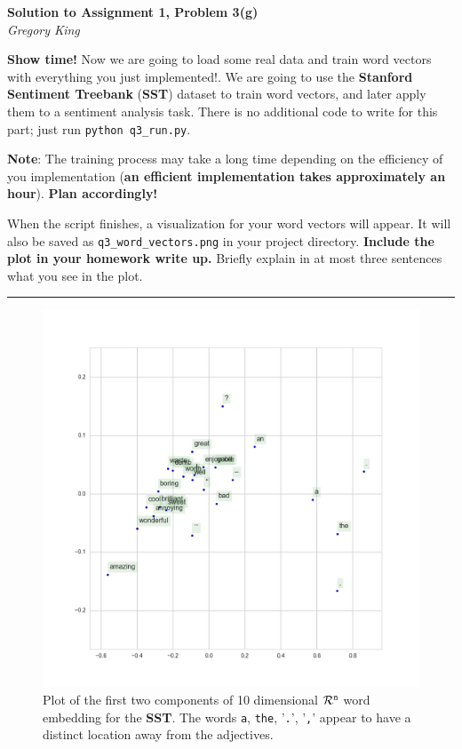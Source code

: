 \documentclass[letter,12pt]{article}
\newcommand{\myhwtitle}[3]
{\begin{center}
{\large {\bf Solution to Assignment {#1}, Problem {#2}}}\\
\medskip 
{\it {#3}} %
\end{center}}
\begin{document}
\clearpage
\myhwtitle{1}{3(g)}{Gregory King}
\bigskip
\noindent \textbf{Show time!} Now we are going to load some real data and train word vectors with everything you just implemented!. We are going to use
the \textbf{Stanford Sentiment Treebank} (\textbf{SST}) dataset to train word vectors, and later apply them to a sentiment analysis task. There is no additional code to write
for this part; just run \texttt{python q3\_run.py}.

\noindent\textbf{Note}: The training process may take a long time depending on the efficiency of you implementation (\textbf{an efficient implementation takes approximately an hour}). \textbf{Plan accordingly!}

\noindent When the script finishes, a visualization for your word vectors will appear. It will also be saved as \texttt{q3\_word\_vectors.png} in your project directory. \textbf{Include the plot in your homework write up.} Briefly explain in at most three sentences what you see in the plot.\vspace{5mm}

\noindent\rule{\textwidth}{0.4pt}\vspace{5mm}

\begin{figure}
\begin{center}
\includegraphics[scale=0.5]{../q3_word_vectors.png}
\caption{Plot of the first two components of 10 dimensional $\cal{R}^{\texttt{n}}$ word embedding for the \textbf{SST}. The words \texttt{a}, \texttt{the}, '\texttt{.}', '\texttt{,}' appear to have a distinct location away from the adjectives.}
\end{center}
\end{figure}
\end{document}
